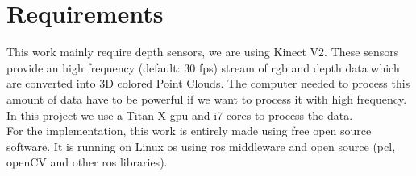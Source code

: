 \section*{Requirements}

This work mainly require depth sensors, we are using Kinect V2. These sensors provide an high frequency (default: 30 \acrshort{fps}) stream of \acrshort{rgb} and depth data which are converted into 3D colored Point Clouds. The computer needed to process this amount of data have to be powerful if we want to process it with high frequency. In this project we use a Titan X \acrshort{gpu} and i7 cores to process the data.\\
For the implementation, this work is entirely made using free \gls{open source} software. It is running on Linux \acrshort{os} using \acrshort{ros} \gls{middleware} and \gls{open source}  (\acrshort{pcl}, openCV and other \acrshort{ros} libraries).
